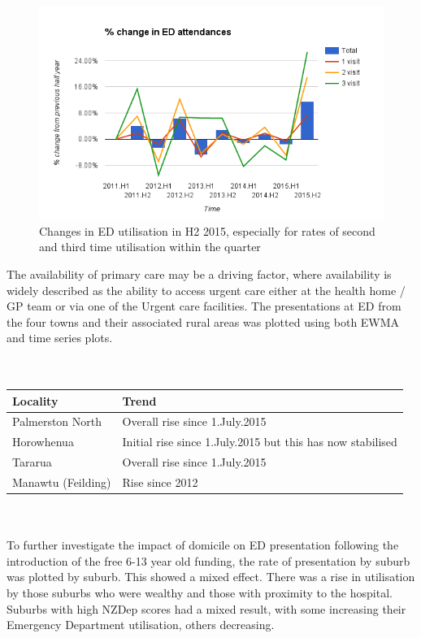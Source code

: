 \documentclass[11pt,a4paper]{article}
\begin{document}
\begin{figure}[htp]
\centering
\includegraphics[scale=0.70]{Fchange.png}
\caption{Changes in ED utilisation in H2 2015, especially for rates of second and third time utilisation within the quarter}
\label{Changes in ED utilisation}
\end{figure}

The availability of primary care may be a driving factor, where availability is widely described as the ability to access urgent care either at the health home / GP team or via one of the Urgent care facilities. The presentations at ED from the four towns and their associated rural areas was plotted using both EWMA and time series plots. \\ 
\\
\\
\begin{tabular}{|l|l|}
\hline 
	Locality & Trend\\
\hline
	Palmerston North & Overall rise since 1.July.2015\\
\hline
	Horowhenua & Initial rise since 1.July.2015 but this has now stabilised\\
\hline
	Tararua & Overall rise since 1.July.2015\\
\hline
	Manawtu (Feilding) & Rise since 2012\\
\hline
\end{tabular}
\\
\\
To further investigate the impact of domicile on ED presentation following the introduction of the free 6-13 year old funding, the rate of presentation by suburb was plotted by suburb. This showed a mixed effect. There was a rise in utilisation by those suburbs who were wealthy and those with proximity to the hospital. Suburbs with high NZDep scores had a mixed result, with some increasing their Emergency Department utilisation, others decreasing.
\pagebreak
\end{document}
